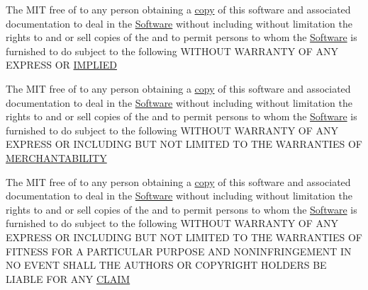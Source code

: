 \begin{DoxyCompactItemize}
\item 
The M\+IT free of to any person obtaining a \hyperlink{LICENSE_8txt_aff1d4c6b756ebf691fa44a0904f68658}{copy} of this software and associated documentation to deal in the \hyperlink{LICENSE_8txt_a22a1529885b3e9d66b0c72fe604fc3dc}{Software} without including without limitation the rights to and or sell copies of the and to permit persons to whom the \hyperlink{LICENSE_8txt_a22a1529885b3e9d66b0c72fe604fc3dc}{Software} is furnished to do subject to the following W\+I\+T\+H\+O\+UT W\+A\+R\+R\+A\+N\+TY OF A\+NY E\+X\+P\+R\+E\+SS OR \hyperlink{LICENSE_8txt_ab0624cdd79a1b72ae3e8cb7b147149da}{I\+M\+P\+L\+I\+ED}
\item 
The M\+IT free of to any person obtaining a \hyperlink{LICENSE_8txt_aff1d4c6b756ebf691fa44a0904f68658}{copy} of this software and associated documentation to deal in the \hyperlink{LICENSE_8txt_a22a1529885b3e9d66b0c72fe604fc3dc}{Software} without including without limitation the rights to and or sell copies of the and to permit persons to whom the \hyperlink{LICENSE_8txt_a22a1529885b3e9d66b0c72fe604fc3dc}{Software} is furnished to do subject to the following W\+I\+T\+H\+O\+UT W\+A\+R\+R\+A\+N\+TY OF A\+NY E\+X\+P\+R\+E\+SS OR I\+N\+C\+L\+U\+D\+I\+NG B\+UT N\+OT L\+I\+M\+I\+T\+ED TO T\+HE W\+A\+R\+R\+A\+N\+T\+I\+ES OF \hyperlink{LICENSE_8txt_a82e4fcb28d3925b81ac5f50e2b22c270}{M\+E\+R\+C\+H\+A\+N\+T\+A\+B\+I\+L\+I\+TY}
\item 
The M\+IT free of to any person obtaining a \hyperlink{LICENSE_8txt_aff1d4c6b756ebf691fa44a0904f68658}{copy} of this software and associated documentation to deal in the \hyperlink{LICENSE_8txt_a22a1529885b3e9d66b0c72fe604fc3dc}{Software} without including without limitation the rights to and or sell copies of the and to permit persons to whom the \hyperlink{LICENSE_8txt_a22a1529885b3e9d66b0c72fe604fc3dc}{Software} is furnished to do subject to the following W\+I\+T\+H\+O\+UT W\+A\+R\+R\+A\+N\+TY OF A\+NY E\+X\+P\+R\+E\+SS OR I\+N\+C\+L\+U\+D\+I\+NG B\+UT N\+OT L\+I\+M\+I\+T\+ED TO T\+HE W\+A\+R\+R\+A\+N\+T\+I\+ES OF F\+I\+T\+N\+E\+SS F\+OR A P\+A\+R\+T\+I\+C\+U\+L\+AR P\+U\+R\+P\+O\+SE A\+ND N\+O\+N\+I\+N\+F\+R\+I\+N\+G\+E\+M\+E\+NT IN NO E\+V\+E\+NT S\+H\+A\+LL T\+HE A\+U\+T\+H\+O\+RS OR C\+O\+P\+Y\+R\+I\+G\+HT H\+O\+L\+D\+E\+RS BE L\+I\+A\+B\+LE F\+OR A\+NY \hyperlink{LICENSE_8txt_a6748037be7bf72df72169eafdc8c492e}{C\+L\+A\+IM}
\item 

\end{DoxyCompactItemize}
